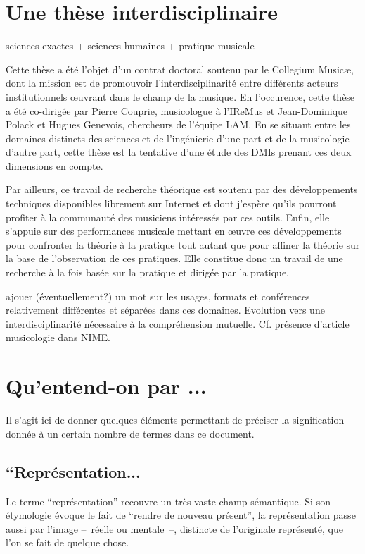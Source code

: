 \section{Une thèse interdisciplinaire}

sciences exactes + sciences humaines + pratique musicale

\noindent Cette thèse a été l'objet d'un contrat doctoral soutenu par le Collegium Musicæ, dont la mission est de promouvoir l'interdisciplinarité entre différents acteurs institutionnels œuvrant dans le champ de la musique. En l'occurence, cette thèse a été co-dirigée par Pierre Couprie, musicologue à l'\gls{IReMus} et Jean-Dominique Polack et Hugues Genevois, chercheurs de l'équipe \gls{LAM}. En se situant entre les domaines distincts des sciences et de l'ingénierie d'une part et de la musicologie d'autre part, cette thèse est la tentative d'une étude des \glspl{DMI} prenant ces deux dimensions en compte.

Par ailleurs, ce travail de recherche théorique est soutenu par des développements techniques disponibles librement sur Internet et dont j'espère qu'ils pourront profiter à la communauté des musiciens intéressés par ces outils.
Enfin, elle s'appuie sur des performances musicale mettant en œuvre ces développements pour confronter la théorie à la pratique tout autant que pour affiner la théorie sur la base de l'observation de ces pratiques. Elle constitue donc un travail de une recherche à la fois basée sur la pratique et dirigée par la pratique.


ajouer (éventuellement?) un mot sur les usages, formats et conférences relativement différentes et séparées dans ces domaines. 
Evolution vers une interdisciplinarité nécessaire à la compréhension mutuelle. Cf. présence d'article musicologie dans NIME.


\section{Qu'entend-on par ...}

\noindent Il s'agit ici de donner quelques éléments permettant de préciser la signification donnée à un certain nombre de termes dans ce document.

\subsection*{``Représentation...}

\noindent Le terme ``représentation'' recouvre un très vaste champ sémantique. Si son étymologie évoque le fait de ``rendre de nouveau présent'', la représentation passe aussi par l'image --~réelle ou mentale~--, distincte de l'originale représenté, que l'on se fait de quelque chose.

